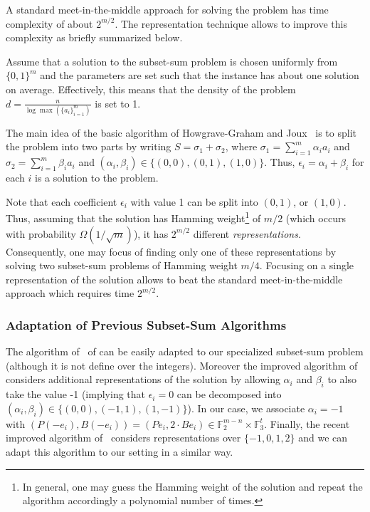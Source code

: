 \documentclass{article}
\begin{document}
A standard meet-in-the-middle approach for solving the problem has time complexity of about $2^{m/2}$.
The representation technique allows to improve this complexity as briefly summarized below.

Assume that a solution to the subset-sum problem is chosen uniformly from $\{0,1\}^m$
and the parameters are set such that the instance has about one solution on average. Effectively, this means that the density of the problem $d = \tfrac{n}{\log \max(\{a_i\}_{i=1}^{m})}$ is set to 1.

The main idea of the basic algorithm of Howgrave{-}Graham and Joux~\cite{Howgrave-GrahamJ10}
is to split the problem into two parts by writing
$S = \sigma_1 + \sigma_2$,
where $\sigma_1 = \sum_{i=1}^{m} \alpha_i a_i$ and $\sigma_2 = \sum_{i=1}^{m} \beta_i a_i$
and $(\alpha_i,\beta_i) \in \{(0,0),(0,1),(1,0)\}$.
Thus, $\epsilon_i = \alpha_i + \beta_i$ for each $i$ is a solution to the problem.

Note that each coefficient $\epsilon_i$ with value 1 can be split into $(0,1)$, or $(1,0)$.
Thus, assuming that the solution has Hamming weight\footnote{In general, one
may guess the Hamming weight of the solution and
repeat the algorithm accordingly a polynomial number of times.} of $m/2$
(which occurs with probability $\Omega(1/\sqrt{m})$),
it has $2^{m/2}$ different \emph{representations}.
Consequently, one may focus of finding only one of these representations
by solving two subset-sum problems of Hamming weight $m/4$.
Focusing on a single representation of the solution
allows to beat the standard meet-in-the-middle approach which requires time $2^{m/2}$.

\subsubsection{Adaptation of Previous Subset-Sum Algorithms}
The algorithm of~\cite{Howgrave-GrahamJ10} of can be easily adapted
to our specialized subset-sum problem (although it is not define over the integers).
Moreover the improved algorithm of~\cite{BeckerCJ11} considers additional representations
of the solution by allowing $\alpha_i$ and $\beta_i$ to also take the value -1
(implying that $\epsilon_i = 0$ can be decomposed into
$(\alpha_i,\beta_i) \in \{(0,0),(-1,1),(1,-1)\}$).
In our case, we associate $\alpha_i = -1$
with $(P(-e_i), B(-e_i)) = (Pe_i, 2 \cdot Be_i)  \in \mathbb{F}_2^{m-n} \times \mathbb{F}_3^t$.
Finally, the recent improved algorithm of~\cite{BonnetainBSS20} considers representations over
$\{-1,0,1,2\}$ and we can adapt this algorithm to our setting in a similar way.
\end{document}
